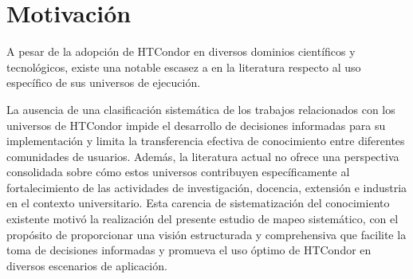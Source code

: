 \section{Motivación}\label{sec:motivacion}


A pesar de la adopción de HTCondor en diversos dominios científicos y tecnológicos,
existe una notable escasez a en la literatura respecto al uso específico de sus universos de ejecución.

La ausencia de una clasificación sistemática de los trabajos relacionados
con los universos de HTCondor impide el desarrollo de decisiones informadas para su implementación y
limita la transferencia efectiva de conocimiento entre diferentes comunidades de usuarios.
Además, la literatura actual no ofrece una perspectiva consolidada sobre cómo estos
universos contribuyen específicamente al fortalecimiento de las actividades de investigación,
docencia, extensión e industria en el contexto universitario. Esta carencia de sistematización
del conocimiento existente motivó la realización del presente estudio de mapeo sistemático,
con el propósito de proporcionar una visión estructurada y comprehensiva que facilite la toma
de decisiones informadas y promueva el uso óptimo de HTCondor en diversos escenarios de aplicación.